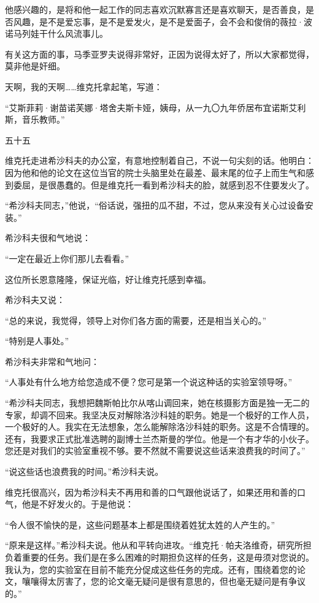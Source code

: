 他感兴趣的，是将和他一起工作的同志喜欢沉默寡言还是喜欢聊天，是否善良，是否风趣，是不是爱忘事，是不是爱发火，是不是爱面子，会不会和俊俏的薇拉·波诺马列娃干什么风流事儿。

有关这方面的事，马季亚罗夫说得非常好，正因为说得太好了，所以大家都觉得，莫非他是奸细。

天啊，我的天啊……维克托拿起笔，写道：

“艾斯菲莉·谢苗诺芙娜·塔舍夫斯卡娅，姨母，从一九〇九年侨居布宜诺斯艾利斯，音乐教师。”

五十五

维克托走进希沙科夫的办公室，有意地控制着自己，不说一句尖刻的话。他明白：因为他和他的论文在这位当官的院士头脑里处在最差、最末尾的位子上而生气和感到委屈，是很愚蠢的。但是维克托一看到希沙科夫的脸，就感到忍不住要发火了。

“希沙科夫同志，”他说，“俗话说，强扭的瓜不甜，不过，您从来没有关心过设备安装。”

希沙科夫很和气地说：

“一定在最近上你们那儿去看看。”

这位所长恩意隆隆，保证光临，好让维克托感到幸福。

希沙科夫又说：

“总的来说，我觉得，领导上对你们各方面的需要，还是相当关心的。”

“特别是人事处。”

希沙科夫非常和气地问：

“人事处有什么地方给您造成不便？您可是第一个说这种话的实验室领导呀。”

“希沙科夫同志，我想把魏斯帕比尔从喀山调回来，她在核摄影方面是独一无二的专家，却调不回来。我坚决反对解除洛沙科娃的职务。她是一个极好的工作人员，一个极好的人。我实在无法想象，怎么能解除洛沙科娃的职务。这是不合情理的。还有，我要求正式批准选聘的副博士兰杰斯曼的学位。他是一个有才华的小伙子。您还是对我们的实验室重视不够。要不然就不需要说这些话来浪费我的时间了。”

“说这些话也浪费我的时间。”希沙科夫说。

维克托很高兴，因为希沙科夫不再用和善的口气跟他说话了，如果还用和善的口气，他是不好发火的。于是他说：

“令人很不愉快的是，这些问题基本上都是围绕着姓犹太姓的人产生的。”

“原来是这样。”希沙科夫说。他从和平转向进攻。“维克托·帕夫洛维奇，研究所担负着重要的任务。我们是在多么困难的时期担负这样的任务，这是毋须对您说的。我认为，您的实验室在目前不能充分促成这些任务的完成。还有，围绕着您的论文，嚷嚷得太厉害了，您的论文毫无疑问是很有意思的，但也毫无疑问是有争议的。”

